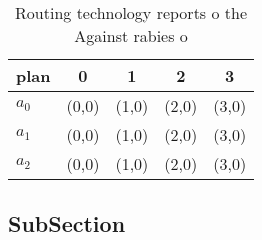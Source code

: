 \documentclass[a4paper]{article}
\begin{document}
\begin{table}
\begin{adjustbox}{width=0.6\columnwidth}
\begin{tabular}{|l|l|l|l|l|}
\hline
\textbf{plan} & \multicolumn{1}{c|}{\textbf{0}} & \multicolumn{1}{c|}{\textbf{1}} & \multicolumn{1}{c|}{\textbf{2}} & \multicolumn{1}{c|}{\textbf{3}} \\ \hline
\textbf{$a_0$}  & (0,0) & (1,0) & (2,0) & (3,0) \\ \hline
\textbf{$a_1$}  & (0,0) & (1,0) & (2,0) & (3,0) \\ \hline
\textbf{$a_2$}  & (0,0) & (1,0) & (2,0) & (3,0) \\ \hline
\end{tabular}
\end{adjustbox}
\caption{Routing technology reports o the Against rabies o
}
\end{table}

\subsection{SubSection}
\end{document}
